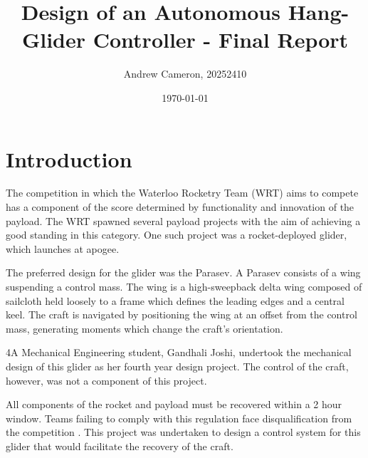 \documentclass{sydeStyle}
\title{
Design of an Autonomous Hang-Glider Controller - Final Report
}
\date{\today}
\author{Andrew Cameron, 20252410}
\begin{document}

\maketitle

\tableofcontents

\chapter{Introduction}

The competition in which the Waterloo Rocketry Team (WRT) aims to compete has a
component of the score determined by functionality and innovation of the
payload\cite{IREC}. The WRT spawned several payload projects with the aim of
achieving a good standing in this category. One such project was a
rocket-deployed glider, which launches at apogee.

The preferred design for the glider was the Parasev. A Parasev consists of a
wing suspending a control mass\cite{wiki:parasev}. The wing is a high-sweepback
delta wing composed of sailcloth held loosely to a frame which defines the
leading edges and a central keel. The craft is navigated by positioning the wing
at an offset from the control mass, generating moments which change the craft's
orientation.

4A Mechanical Engineering student, Gandhali Joshi, undertook the mechanical
design of this glider as her fourth year design project. The control of the
craft, however, was not a component of this project.

All components of the rocket and payload must be recovered within a 2 hour
window. Teams failing to comply with this regulation face disqualification from
the competition \cite{IREC}. This project was undertaken to design a control
system for this glider that would facilitate the recovery of the craft.
\end{document}
